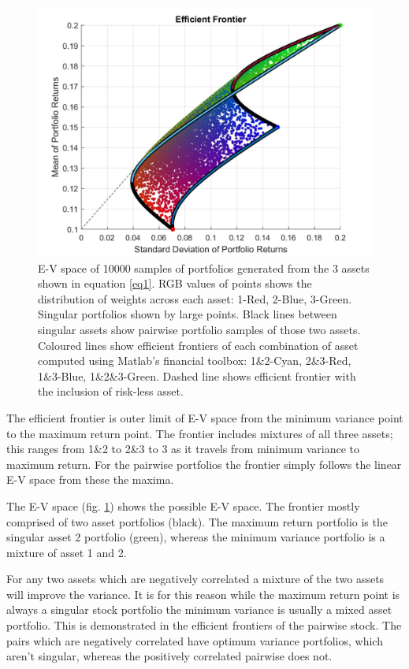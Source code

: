 \documentclass[a4paper,10pt, twocolumn]{article}
\begin{document}
\begin{figure}[t]
	\includegraphics[width=\textwidth]{EVspace.jpg}
	\centering
	\caption{E-V space of 10000 samples of portfolios generated from the 3 assets shown in equation \ref{eq1}. RGB values of points shows the distribution of weights across each asset: 1-Red, 2-Blue, 3-Green. Singular portfolios shown by large points. Black lines between singular assets show pairwise portfolio samples of those two assets. Coloured lines show efficient frontiers of each combination of asset computed using Matlab's financial toolbox: 1\&2-Cyan, 2\&3-Red, 1\&3-Blue, 1\&2\&3-Green. Dashed line shows efficient frontier with the inclusion of risk-less asset.}
			\label{fig:EVspace}
\end{figure} 

The efficient frontier is outer limit of E-V space from the minimum variance point to the maximum return point. The frontier includes mixtures of all three assets; this ranges from 1\&2 to 2\&3 to 3 as it travels from minimum variance to maximum return. For the pairwise portfolios the frontier simply follows the linear E-V space from these the maxima.

The E-V space (fig. \ref{fig:EVspace}) shows the possible E-V space. The frontier mostly comprised of two asset portfolios (black). The maximum return portfolio is the singular asset 2 portfolio (green), whereas the minimum variance portfolio is a mixture of asset 1 and 2.

For any two assets which are negatively correlated a mixture of the two assets will improve the variance. It is for this reason while the maximum return point is always a singular stock portfolio the minimum variance is usually a mixed asset portfolio. This is demonstrated in the efficient frontiers of the pairwise stock. The pairs which are negatively correlated have optimum variance portfolios, which aren't singular, whereas the positively correlated pairwise does not.
\end{document}
